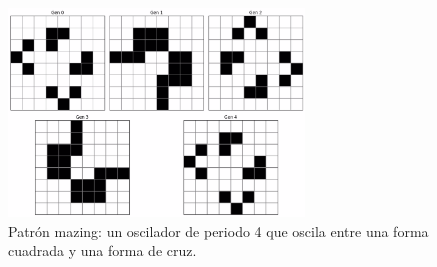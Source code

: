 \documentclass[]{article}
\begin{document}
\begin{figure}[H]
  \centering
  \includegraphics[width=0.7\textwidth]{../assets/oscillator/mazing/mazing.jpg}
  \caption{Patrón mazing: un oscilador de periodo 4 que oscila entre una forma cuadrada y una forma de cruz.}
  \label{fig:mazing}
\end{figure}
\end{document}
